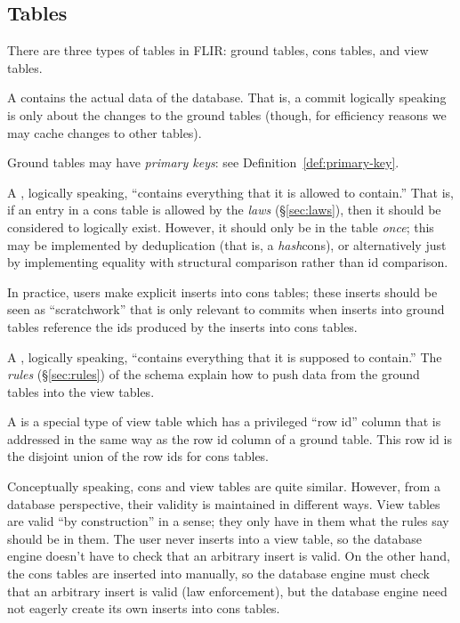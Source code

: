 \documentclass{scrartcl}
\begin{document}
\subsection{Tables}

There are three types of tables in FLIR: ground tables, cons tables, and view tables.

\begin{definition}
  A  contains the actual data of the database. That is, a commit logically speaking is only about the changes to the ground tables (though, for efficiency reasons we may cache changes to other tables).

  Ground tables may have \emph{primary keys}: see Definition~\ref{def:primary-key}.
\end{definition}

\begin{definition}
  A , logically speaking, ``contains everything that it is allowed to contain.'' That is, if an entry in a cons table is allowed by the \emph{laws} (\S\ref{sec:laws}), then it should be considered to logically exist. However, it should only be in the table \emph{once}; this may be implemented by deduplication (that is, a \emph{hash}cons), or alternatively just by implementing equality with structural comparison rather than id comparison.

  In practice, users make explicit inserts into cons tables; these inserts should be seen as ``scratchwork'' that is only relevant to commits when inserts into ground tables reference the ids produced by the inserts into cons tables.
\end{definition}

\begin{definition}
  A , logically speaking, ``contains everything that it is supposed to contain.'' The \emph{rules} (\S\ref{sec:rules}) of the schema explain how to push data from the ground tables into the view tables.
\end{definition}

\begin{definition}
  A  is a special type of view table which has a privileged ``row id'' column that is addressed in the same way as the row id column of a ground table. This row id is the disjoint union of the row ids for cons tables.
\end{definition}

Conceptually speaking, cons and view tables are quite similar. However, from a database perspective, their validity is maintained in different ways. View tables are valid ``by construction'' in a sense; they only have in them what the rules say should be in them. The user never inserts into a view table, so the database engine doesn't have to check that an arbitrary insert is valid. On the other hand, the cons tables are inserted into manually, so the database engine must check that an arbitrary insert is valid (law enforcement), but the database engine need not eagerly create its own inserts into cons tables.
\end{document}
